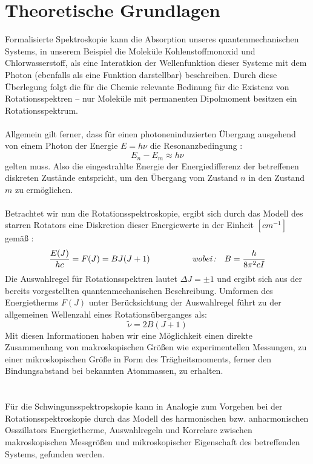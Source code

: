 %
%

\section{Theoretische Grundlagen}
Formalisierte Spektroskopie kann die Absorption unseres quantenmechanischen Systems, in unserem Beispiel die Moleküle Kohlenstoffmonoxid und Chlorwasserstoff, als eine Interatkion der Wellenfunktion dieser Systeme mit dem Photon (ebenfalls als eine Funktion darstellbar) beschreiben. Durch diese Überlegung folgt die für die Chemie relevante Bedinung für die Existenz von Rotationsspektren -- nur Moleküle mit permanenten Dipolmoment besitzen ein Rotationsspektrum.\\
\\
Allgemein gilt ferner, dass für einen photoneninduzierten Übergang ausgehend von einem Photon der Energie $E = h \nu$ die Resonanzbedingung : \\
\begin{equation}
E_n - E_m \approx h \nu
\end{equation}
gelten muss. Also die eingestrahlte Energie der Energiedifferenz der betreffenen diskreten Zustände entspricht, um den Übergang vom Zustand $n$ in den Zustand $m$ zu ermöglichen.\\
\\
Betrachtet wir nun die Rotationsspektroskopie, ergibt sich durch das Modell des starren Rotators eine Diskretion dieser Energiewerte in der Einheit $[cm^{-1}]$ gemäß :
\begin{equation}
\frac{E(J)}{hc} =F(J) = BJ(J+1)\quad \quad\quad\quad\quad\textit{wobei\,:}\quad B=\frac{h}{8\pi^2cI}
\end{equation}
Die Auswahlregel für Rotationsspektren lautet $\Delta J = \pm 1$ und ergibt sich aus der bereits vorgestellten quantenmechanischen Beschreibung. Umformen des Energietherms $F(J)$ unter Berücksichtung der Auswahlregel führt zu der allgemeinen Wellenzahl eines Rotationsüberganges als: 
\begin{equation}
\tilde{\nu} = 2B(J+1)
\end{equation}
Mit diesen Informationen haben wir eine Möglichkeit einen direkte Zusammenhang von makroskopischen Größen wie experimentellen Messungen, zu einer mikroskopischen Größe in Form des Trägheitsmoments, ferner den Bindungsabstand bei bekannten Atommassen, zu erhalten.\\
\\
\\
Für die Schwingunsspektropskopie kann in Analogie zum Vorgehen bei der Rotationsspektroskopie durch das Modell des harmonischen bzw. anharmonischen Osszillators Energietherme, Auswahlregeln und Korrelare zwischen makroskopischen Messgrößen und mikroskopischer Eigenschaft des betreffenden Systems, gefunden werden.\\
